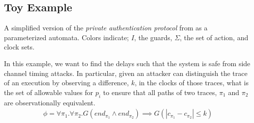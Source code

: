 \subsection{Toy Example}

A simplified version of the \textit{private authentication protocol} from \cite{timing_analysis_of_security_protocls} as a parameterized automata. Colors indicate; {\color{olive} $I$, the guards}, {\color{blue} $\Sigma$, the set of action}, and {\color{violet} clock sets}.


In this example, we want to find the delays such that the system is safe from side channel timing attacks. In particular, given an attacker can distinguish the trace of an execution by observing a difference, $k$, in the clocks of those traces, what is the set of allowable values for $p_i$ to ensure that all paths of two traces, $\pi_1$ and $\pi_2$ are observationally equivalent. 
\begin{align*}
    \phi = \forall \pi_1 . \forall \pi_2 . G (end_{\pi_1} \land end_{\pi_2}) \implies G (|c_{\pi_1} - c_{\pi_2}| \leq k)
\end{align*}


